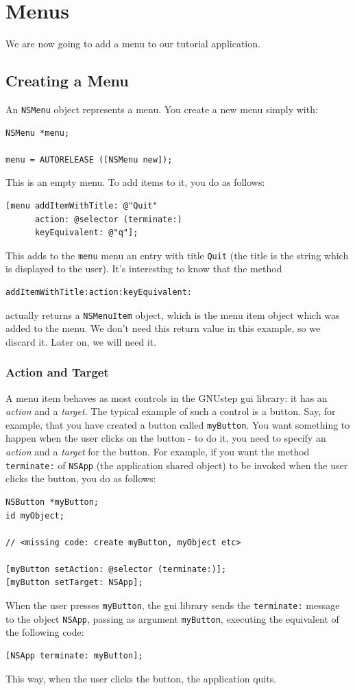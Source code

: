 \documentclass[a4paper]{article}
\begin{document}
\section{Menus}
We are now going to add a menu to our tutorial application.

\subsection{Creating a Menu}
An \texttt{NSMenu} object represents a menu.  You create a new menu
simply with:
\begin{verbatim}
NSMenu *menu;

menu = AUTORELEASE ([NSMenu new]);
\end{verbatim}
This is an empty menu.  To add items to it, you do as follows:
\begin{verbatim}  
[menu addItemWithTitle: @"Quit" 
      action: @selector (terminate:)
      keyEquivalent: @"q"];	
\end{verbatim}
This adds to the \texttt{menu} menu an entry with title \texttt{Quit}
(the title is the string which is displayed to the user).  It's
interesting to know that the method
\begin{verbatim}  
addItemWithTitle:action:keyEquivalent:
\end{verbatim}
actually returns a \texttt{NSMenuItem} object, which is the menu item
object which was added to the menu.  We don't need this return value
in this example, so we discard it.  Later on, we will need it.

\subsubsection{Action and Target}
A menu item behaves as most controls in the GNUstep gui library: it
has an \emph{action} and a \emph{target}.  The typical example of such
a control is a button.  Say, for example, that you have created a
button called \texttt{myButton}.  You want something to happen when
the user clicks on the button - to do it, you need to specify an
\emph{action} and a \emph{target} for the button.  For example, if you
want the method \texttt{terminate:} of \texttt{NSApp} (the application
shared object) to be invoked when the user clicks the button, you do
as follows:
\begin{verbatim}
NSButton *myButton;
id myObject;

// <missing code: create myButton, myObject etc>

[myButton setAction: @selector (terminate:)];
[myButton setTarget: NSApp];
\end{verbatim}
When the user presses \texttt{myButton}, the gui library sends the
\texttt{terminate:} message to the object \texttt{NSApp}, passing as
argument \texttt{myButton}, executing the equivalent of the following
code:
\begin{verbatim}
[NSApp terminate: myButton];
\end{verbatim}
This way, when the user clicks the button, the application quits.  
\end{document}
